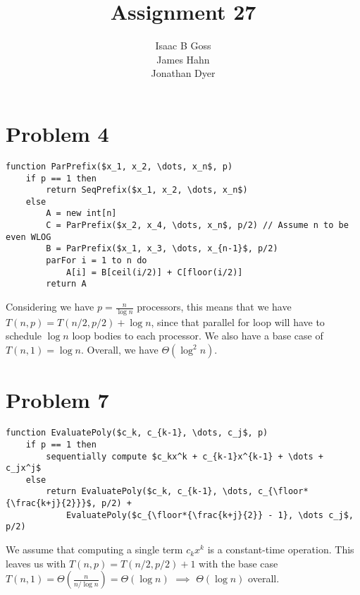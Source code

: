 \documentclass{article}
\author{Isaac B Goss\\ James Hahn\\ Jonathan Dyer}
\title{Assignment 27}
\providecommand{\prob}[1]{\section*{Problem #1}}
\DeclarePairedDelimiter\floor{\lfloor}{\rfloor}
\begin{document}
\maketitle

\prob{4}

\begin{lstlisting}
function ParPrefix($x_1, x_2, \dots, x_n$, p)
    if p == 1 then
        return SeqPrefix($x_1, x_2, \dots, x_n$)
    else
        A = new int[n]
        C = ParPrefix($x_2, x_4, \dots, x_n$, p/2) // Assume n to be even WLOG
        B = ParPrefix($x_1, x_3, \dots, x_{n-1}$, p/2)
        parFor i = 1 to n do
            A[i] = B[ceil(i/2)] + C[floor(i/2)]
        return A
\end{lstlisting}

Considering we have $p = \frac{n}{\log n}$ processors, this means that we have $T(n, p) = T(n/2, p/2) + \log n$, since that parallel for loop will have to schedule $\log n$ loop bodies to each processor.
We also have a base case of $T(n, 1) = \log n$.
Overall, we have $\Theta(\log^2 n)$.

\prob{7}
    \begin{lstlisting}
function EvaluatePoly($c_k, c_{k-1}, \dots, c_j$, p)
    if p == 1 then
        sequentially compute $c_kx^k + c_{k-1}x^{k-1} + \dots + c_jx^j$
    else
        return EvaluatePoly($c_k, c_{k-1}, \dots, c_{\floor*{\frac{k+j}{2}}}$, p/2) + 
            EvaluatePoly($c_{\floor*{\frac{k+j}{2}} - 1}, \dots c_j$, p/2)
    \end{lstlisting}

    We assume that computing a single term $c_kx^k$ is a constant-time operation.
    This leaves us with $T(n, p) = T(n/2, p/2) + 1$ with the base case $T(n, 1) = \Theta(\frac{n}{n/\log n}) = \Theta(\log n)$ $\implies$ $\Theta(\log n)$ overall.
\end{document}
